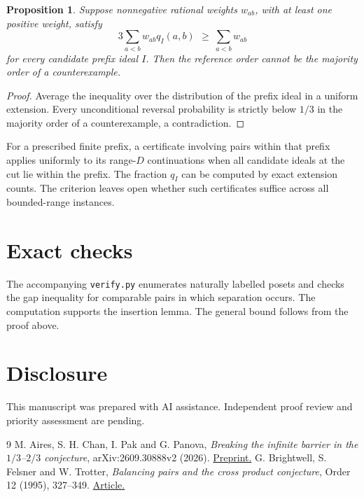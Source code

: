 \documentclass[11pt]{article}
\newtheorem{proposition}[theorem]{Proposition}
\begin{document}
\begin{proposition}
Suppose nonnegative rational weights $w_{ab}$, with at least one positive weight, satisfy
\[
 3\sum_{a<b}w_{ab}q_I(a,b)\ \,\ge\ \sum_{a<b}w_{ab}
\]
for every candidate prefix ideal $I$. Then the reference order cannot be the majority order of a counterexample.
\end{proposition}
\begin{proof}
Average the inequality over the distribution of the prefix ideal in a uniform extension. Every unconditional reversal probability is strictly below $1/3$ in the majority order of a counterexample, a contradiction.
\end{proof}

For a prescribed finite prefix, a certificate involving pairs within that prefix applies uniformly to its range-$D$ continuations when all candidate ideals at the cut lie within the prefix. The fraction $q_I$ can be computed by exact extension counts. The criterion leaves open whether such certificates suffice across all bounded-range instances.

\section{Exact checks}
The accompanying \texttt{verify.py} enumerates naturally labelled posets and checks the gap inequality for comparable pairs in which separation occurs. The computation supports the insertion lemma. The general bound follows from the proof above.

\section*{Disclosure}
This manuscript was prepared with AI assistance. Independent proof review and priority assessment are pending.

\begin{thebibliography}{9}
 M. Aires, S. H. Chan, I. Pak and G. Panova, \emph{Breaking the infinite barrier in the $1/3$--$2/3$ conjecture}, arXiv:2609.30888v2 (2026). \href{https://arxiv.org/html/2609.30888v2}{Preprint.}
 G. Brightwell, S. Felsner and W. Trotter, \emph{Balancing pairs and the cross product conjecture}, Order 12 (1995), 327--349. \href{https://trotter.math.gatech.edu/papers/97.pdf}{Article.}
\end{thebibliography}
\end{document}
